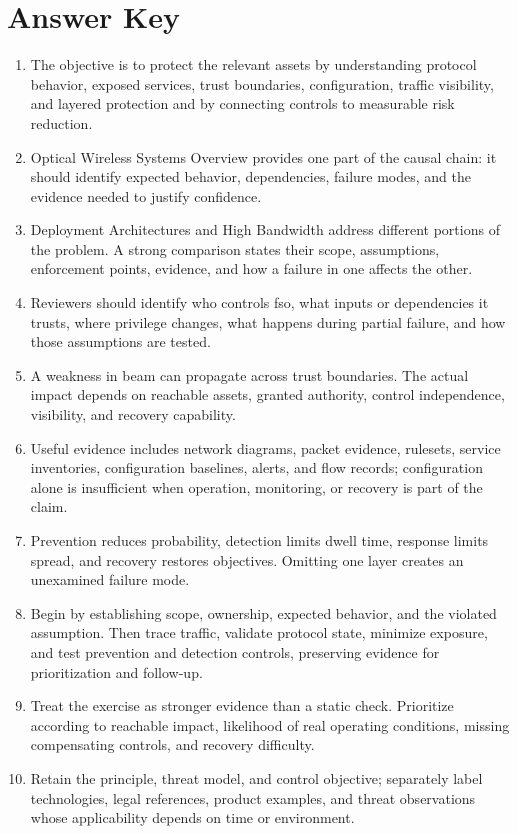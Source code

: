 \documentclass[11pt,letterpaper]{article}
\begin{document}
\section*{Answer Key}
\begin{enumerate}
\item The objective is to protect the relevant assets by understanding protocol behavior, exposed services, trust boundaries, configuration, traffic visibility, and layered protection and by connecting controls to measurable risk reduction.
\item Optical Wireless Systems Overview provides one part of the causal chain: it should identify expected behavior, dependencies, failure modes, and the evidence needed to justify confidence.
\item Deployment Architectures and High Bandwidth address different portions of the problem. A strong comparison states their scope, assumptions, enforcement points, evidence, and how a failure in one affects the other.
\item Reviewers should identify who controls fso, what inputs or dependencies it trusts, where privilege changes, what happens during partial failure, and how those assumptions are tested.
\item A weakness in beam can propagate across trust boundaries. The actual impact depends on reachable assets, granted authority, control independence, visibility, and recovery capability.
\item Useful evidence includes network diagrams, packet evidence, rulesets, service inventories, configuration baselines, alerts, and flow records; configuration alone is insufficient when operation, monitoring, or recovery is part of the claim.
\item Prevention reduces probability, detection limits dwell time, response limits spread, and recovery restores objectives. Omitting one layer creates an unexamined failure mode.
\item Begin by establishing scope, ownership, expected behavior, and the violated assumption. Then trace traffic, validate protocol state, minimize exposure, and test prevention and detection controls, preserving evidence for prioritization and follow-up.
\item Treat the exercise as stronger evidence than a static check. Prioritize according to reachable impact, likelihood of real operating conditions, missing compensating controls, and recovery difficulty.
\item Retain the principle, threat model, and control objective; separately label technologies, legal references, product examples, and threat observations whose applicability depends on time or environment.
\end{enumerate}
\end{document}
